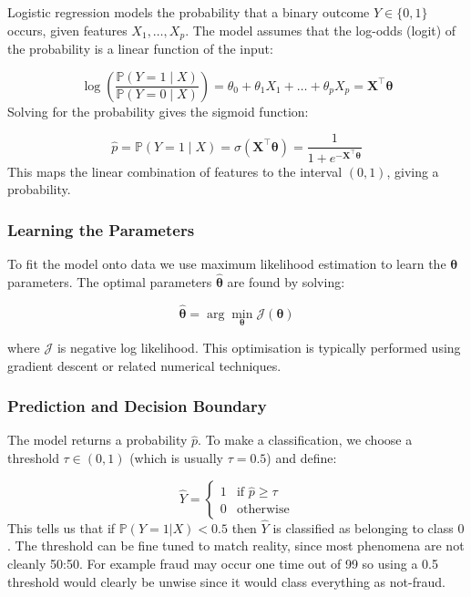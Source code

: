 \documentclass[9pt]{extarticle}
\begin{document}
Logistic regression models the probability that a 
binary outcome $Y \in \{0, 1\}$ occurs, 
given features $X_1, \dots, X_p$. The 
model assumes that the log-odds (logit) of the 
probability is a linear function of the input:

\[
\log\left( \frac{\mathbb{P}(Y = 1 \mid X)}{\mathbb{P}(Y = 0 \mid X)} \right) = \theta_0 + \theta_1 X_1 + \dots + \theta_p X_p = \mathbf{X}^\top \boldsymbol{\theta}
\]
Solving for the probability gives the sigmoid function:

\[
\hat{p} = \mathbb{P}(Y = 1 \mid X) = \sigma(\mathbf{X}^\top \boldsymbol{\theta}) = \frac{1}{1 + e^{-\mathbf{X}^\top \boldsymbol{\theta}}}
\]
This maps the linear combination of features to the 
interval $(0, 1)$, giving a probability.

\subsubsection*{Learning the Parameters}

To fit the model onto data we use maximum likelihood estimation to learn 
the $\boldsymbol{\theta}$ parameters. The optimal parameters $\boldsymbol{\hat{\theta}}$ are found by solving:

\[
\boldsymbol{\hat{\theta}} = \arg\min_{\boldsymbol{\theta}} \mathcal{J}(\boldsymbol{\theta})
\]

where $\mathcal{J}$ is negative log likelihood. 
This optimisation is typically performed using gradient descent or related numerical techniques.

\subsubsection*{Prediction and Decision Boundary}

The model returns a probability $\hat{p}$. To make a classification, we 
choose a threshold $\tau \in (0,1)$ (which is usually $\tau = 0.5$) and define:

\[
\hat{Y} = 
\begin{cases}
1 & \text{if } \hat{p} \geq \tau \\
0 & \text{otherwise}
\end{cases}
\]
This tells us that if $\mathbb{P}(Y=1|X)<0.5$ then $\hat{Y}$ is 
classified as belonging to class $0$. The threshold can be fine tuned 
to match reality, since most phenomena are not cleanly 50:50. For example 
fraud may occur one time out of 99 so using a 0.5 threshold would clearly 
be unwise since it would class everything as not-fraud.
\end{document}
